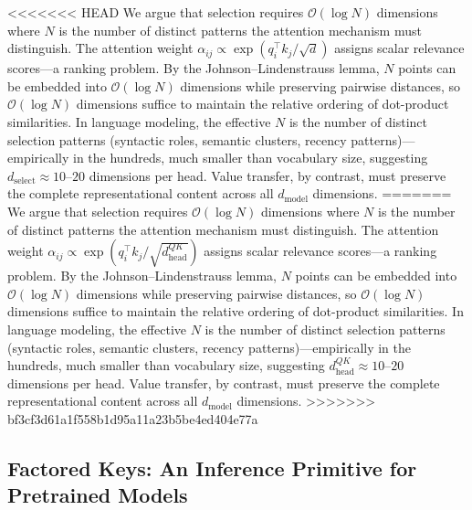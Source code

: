 \documentclass{article} %
\newcommand{\dmodel}{d_{\text{model}}}
\newcommand{\dselect}{d_{\text{select}}}
\newcommand{\BigO}{\mathcal{O}}
\begin{document}
<<<<<<< HEAD
We argue that selection requires $\BigO(\log N)$ dimensions where $N$ is the number of distinct patterns the attention mechanism must distinguish. The attention weight $\alpha_{ij} \propto \exp(q_i^\top k_j / \sqrt{d})$ assigns scalar relevance scores---a ranking problem. By the Johnson--Lindenstrauss lemma, $N$ points can be embedded into $\BigO(\log N)$ dimensions while preserving pairwise distances, so $\BigO(\log N)$ dimensions suffice to maintain the relative ordering of dot-product similarities. In language modeling, the effective $N$ is the number of distinct selection patterns (syntactic roles, semantic clusters, recency patterns)---empirically in the hundreds, much smaller than vocabulary size, suggesting $\dselect \approx 10$--$20$ dimensions per head. Value transfer, by contrast, must preserve the complete representational content across all $\dmodel$ dimensions.
=======
We argue that selection requires $\BigO(\log N)$ dimensions where $N$ is the number of distinct patterns the attention mechanism must distinguish. The attention weight $\alpha_{ij} \propto \exp(q_i^\top k_j / \sqrt{d_{\text{head}}^{QK}})$ assigns scalar relevance scores---a ranking problem. By the Johnson--Lindenstrauss lemma, $N$ points can be embedded into $\BigO(\log N)$ dimensions while preserving pairwise distances, so $\BigO(\log N)$ dimensions suffice to maintain the relative ordering of dot-product similarities. In language modeling, the effective $N$ is the number of distinct selection patterns (syntactic roles, semantic clusters, recency patterns)---empirically in the hundreds, much smaller than vocabulary size, suggesting $d_{\text{head}}^{QK} \approx 10$--$20$ dimensions per head. Value transfer, by contrast, must preserve the complete representational content across all $\dmodel$ dimensions.
>>>>>>> bf3cf3d61a1f558b1d95a11a23b5be4ed404e77a


\subsection{Factored Keys: An Inference Primitive for Pretrained Models}
\end{document}
